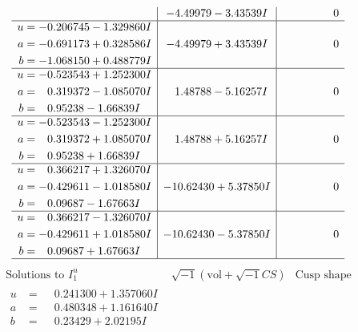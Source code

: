 \documentclass[1p]{elsarticle_modified}
\theoremstyle{definition}
\newcommand{\I}{\sqrt{-1}}
\begin{document}
$$\begin{array}{c|c|c}
 & -4.49979 - 3.43539 I & \phantom{-0.000000 } 0 \\ \hline\begin{aligned}
u &= -0.206745 - 1.329860 I \\
a &= -0.691173 + 0.328586 I \\
b &= -1.068150 + 0.488779 I\end{aligned}
 & -4.49979 + 3.43539 I & \phantom{-0.000000 } 0 \\ \hline\begin{aligned}
u &= -0.523543 + 1.252300 I \\
a &= \phantom{-}0.319372 - 1.085070 I \\
b &= \phantom{-}0.95238 - 1.66839 I\end{aligned}
 & \phantom{-}1.48788 - 5.16257 I & \phantom{-0.000000 } 0 \\ \hline\begin{aligned}
u &= -0.523543 - 1.252300 I \\
a &= \phantom{-}0.319372 + 1.085070 I \\
b &= \phantom{-}0.95238 + 1.66839 I\end{aligned}
 & \phantom{-}1.48788 + 5.16257 I & \phantom{-0.000000 } 0 \\ \hline\begin{aligned}
u &= \phantom{-}0.366217 + 1.326070 I \\
a &= -0.429611 - 1.018580 I \\
b &= \phantom{-}0.09687 - 1.67663 I\end{aligned}
 & -10.62430 + 5.37850 I & \phantom{-0.000000 } 0 \\ \hline\begin{aligned}
u &= \phantom{-}0.366217 - 1.326070 I \\
a &= -0.429611 + 1.018580 I \\
b &= \phantom{-}0.09687 + 1.67663 I\end{aligned}
 & -10.62430 - 5.37850 I & \phantom{-0.000000 } 0\\
 \hline 
 \end{array}$$\newpage$$\begin{array}{c|c|c}  
\text{Solutions to }I^u_{1}& \I (\text{vol} + \sqrt{-1}CS) & \text{Cusp shape}\\
 \hline 
\begin{aligned}
u &= \phantom{-}0.241300 + 1.357060 I \\
a &= \phantom{-}0.480348 + 1.161640 I \\
b &= \phantom{-}0.23429 + 2.02195 I\end{aligned}

\end{array}$$
\end{document}
